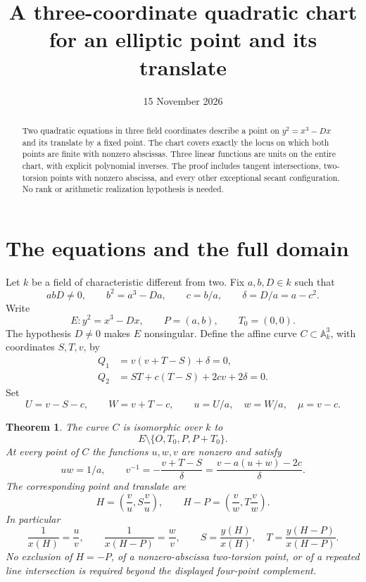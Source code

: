 \documentclass[11pt,a4paper]{article}
\title{A three-coordinate quadratic chart for an elliptic point and its translate}
\author{}\date{15 November 2026}
\newtheorem{theorem}{Theorem}[section]
\begin{document}
\maketitle
\begin{abstract}
Two quadratic equations in three field coordinates describe a point on
$y^2=x^3-Dx$ and its translate by a fixed point. The chart covers exactly
the locus on which both points are finite with nonzero abscissas. Three
linear functions are units on the entire chart, with explicit polynomial
inverses. The proof includes tangent intersections, two-torsion points
with nonzero abscissa, and every other exceptional secant configuration.
No rank or arithmetic realization hypothesis is needed.
\end{abstract}

\section{The equations and the full domain}
Let $k$ be a field of characteristic different from two. Fix
$a,b,D\in k$ such that
\[
 abD\ne0,\qquad b^2=a^3-Da,
 \qquad c=b/a,\qquad \delta=D/a=a-c^2.
\]
Write
\[
 E:y^2=x^3-Dx,\qquad P=(a,b),\qquad T_0=(0,0).
\]
The hypothesis $D\ne0$ makes $E$ nonsingular. Define the affine curve
$C\subset\mathbb A_k^3$, with coordinates $S,T,v$, by
\begin{equation}\label{eq:chart}
 \begin{split}
 Q_1&=v(v+T-S)+\delta=0,\\
 Q_2&=ST+c(T-S)+2cv+2\delta=0.
 \end{split}
\end{equation}
Set
\begin{equation}\label{eq:linear}
 U=v-S-c,\qquad W=v+T-c,\qquad
 u=U/a,\quad w=W/a,\quad\mu=v-c.
\end{equation}

\begin{theorem}\label{thm:chart}
The curve $C$ is isomorphic over $k$ to
\[
                       E\setminus\{O,T_0,P,P+T_0\}.
\]
At every point of $C$ the functions $u,w,v$ are nonzero and satisfy
\begin{equation}\label{eq:units}
 uw=1/a,\qquad
 v^{-1}=-\frac{v+T-S}{\delta}
       =\frac{v-a(u+w)-2c}{\delta}.
\end{equation}
The corresponding point and translate are
\begin{equation}\label{eq:recovery}
 H=\left(\frac vu,S\frac vu\right),\qquad
 H-P=\left(\frac vw,T\frac vw\right).
\end{equation}
In particular
\[
 \frac1{x(H)}=\frac uv,
 \qquad\frac1{x(H-P)}=\frac wv,
 \qquad S=\frac{y(H)}{x(H)},\quad T=\frac{y(H-P)}{x(H-P)}.
\]
No exclusion of $H=-P$, of a nonzero-abscissa two-torsion point,
or of a repeated line intersection is required beyond the displayed
four-point complement.
\end{theorem}
\end{document}
